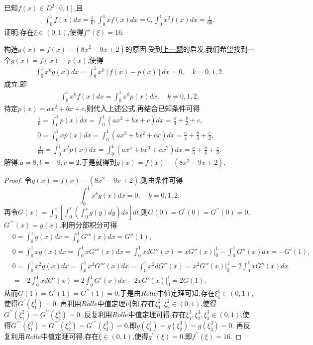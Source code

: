 \documentclass[../../main.tex]{subfiles}
\begin{document}
\begin{example}
已知$f(x)\in D^2[0,1]$,且
\begin{align*}
\int_0^1{f\left( x \right) dx}=\frac{1}{6},\int_0^1{xf\left( x \right) dx}=0,\int_0^1{x^2f\left( x \right) dx}=\frac{1}{60}.
\end{align*}
证明:存在$\xi \in (0,1)$,使得$f''(\xi)=16$.
\end{example}
\begin{note}
构造$g(x)=f(x)-(8x^2 - 9x + 2)$的原因:受到\hyperref[example245574]{上一题}的启发,我们希望找到一个$g(x)=f(x)-p(x)$,使得
\begin{align*}
\int_0^1 x^k g(x)dx =\int_0^1 x^k [f(x)-p(x)]dx = 0, \quad k = 0,1,2.
\end{align*}
成立.即
\begin{align*}
\int_0^1{x^kf(x)dx}=\int_0^1{x^kp(x)dx},\quad k=0,1,2.
\end{align*}
待定$p(x)=ax^2+bx+c$,则代入上述公式,再结合已知条件可得
\begin{gather*}
\frac{1}{6}=\int_0^1{p(x)dx}=\int_0^1{\left( ax^2+bx+c \right) dx}=\frac{a}{3}+\frac{b}{2}+c,
\\
0=\int_0^1{xp(x)dx}=\int_0^1{\left( ax^3+bx^2+cx \right) dx}=\frac{a}{4}+\frac{b}{3}+\frac{c}{2},
\\
\frac{1}{60}=\int_0^1{x^2p(x)dx}=\int_0^1{\left( ax^4+bx^3+cx^2 \right) dx}=\frac{a}{5}+\frac{b}{4}+\frac{c}{3}.
\end{gather*}
解得:$a=8,b=-9,c=2$.于是就得到\(g(x)=f(x)-(8x^2 - 9x + 2)\).
\end{note}
\begin{proof}
令\(g(x)=f(x)-(8x^2 - 9x + 2)\),则由条件可得
\[
\int_0^1 x^k g(x)dx = 0, \quad k = 0,1,2.
\]
再令\(G(x)=\int_0^x\left[\int_0^t\left(\int_0^s g(y)dy\right)ds\right]dt\),则\(G(0)=G^\prime(0)=G^{\prime\prime}(0)=0\),\(G^{\prime\prime\prime}(x)=g(x)\).利用分部积分可得
\begin{align*}
&0=\int_0^1{g\left( x \right) dx}=\int_0^1{G'''\left( x \right) dx}=G''\left( 1 \right) ,
\\
&0=\int_0^1{xg\left( x \right) dx}=\int_0^1{xG'''\left( x \right) dx}=\int_0^1{xdG''\left( x \right)}=xG''\left( x \right) \Big |_{0}^{1}-\int_0^1{G''\left( x \right) dx}=-G'\left( 1 \right) ,
\\
&0=\int_0^1{x^2g\left( x \right) dx}=\int_0^1{x^2G'''\left( x \right) dx}=\int_0^1{x^2dG''\left( x \right)}=x^2G''\left( x \right) \Big |_{0}^{1}-2\int_0^1{xG''\left( x \right) dx}
\\
&=-2\int_0^1{xdG'\left( x \right)}=2\int_0^1{G'\left( x \right) dx}-2xG'\left( x \right) \Big |_{0}^{1}=2G\left( 1 \right) .
\end{align*}
从而\(G(1)=G^\prime(1)=G^{\prime\prime}(1)=0\).于是由\(Rolle\)中值定理可知,存在\(\xi_1^1\in(0,1)\),使得\(G^\prime(\xi_1^1)=0\).
再利用\(Rolle\)中值定理可知,存在\(\xi_1^2,\xi_2^2\in(0,1)\),使得\(G^{\prime\prime}(\xi_1^2)=G^{\prime\prime}(\xi_2^2)=0\).
反复利用\(Rolle\)中值定理可得,存在\(\xi_1^3,\xi_2^3,\xi_3^3\in(0,1)\),使得\(G^{\prime\prime\prime}(\xi_1^3)=G^{\prime\prime\prime}(\xi_2^3)=G^{\prime\prime\prime}(\xi_3^3)=0\).即\(g(\xi_1^3)=g(\xi_2^3)=g(\xi_3^3)=0\).
再反复利用\(Rolle\)中值定理可得,存在\(\xi\in(0,1)\),使得\(g^{\prime\prime}(\xi)=0\).即\(f^{\prime\prime}(\xi)=16\).
\end{proof}
\end{document}
